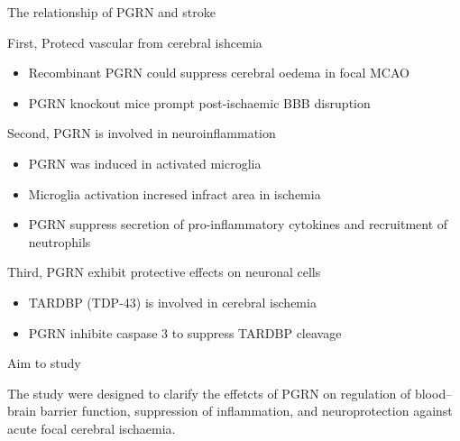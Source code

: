 \documentclass[bigger]{beamer}
\begin{document}
\begin{frame}[label={sec:orgheadline8}]{The relationship of PGRN and stroke}
\begin{block}{First, Protecd vascular from cerebral ishcemia}
\begin{itemize}
\item \footnotesize Recombinant PGRN could suppress cerebral oedema in focal MCAO
\item \footnotesize PGRN knockout mice prompt post-ischaemic BBB disruption
\end{itemize}
\end{block}
\begin{block}{\pause Second, PGRN is involved in neuroinflammation}
\begin{itemize}
\item \footnotesize PGRN was induced in activated microglia
\item \footnotesize Microglia activation incresed infract area in ischemia
\item \footnotesize PGRN suppress secretion of pro-inflammatory cytokines and recruitment of neutrophils
\end{itemize}
\end{block}
\begin{block}{\pause Third, PGRN exhibit protective effects on neuronal cells}
\begin{itemize}
\item \footnotesize TARDBP (TDP-43) is involved in cerebral ischemia
\item \footnotesize PGRN inhibite caspase 3 to suppress TARDBP cleavage
\end{itemize}
\end{block}
\end{frame}
\begin{frame}[label={sec:orgheadline9}]{Aim to study}
\begin{block}{The study were designed to clarify the effetcts of PGRN on regulation of blood–brain barrier function, suppression of inflammation, and neuroprotection against acute focal cerebral ischaemia.}
\end{block}
\end{frame}
\end{document}
